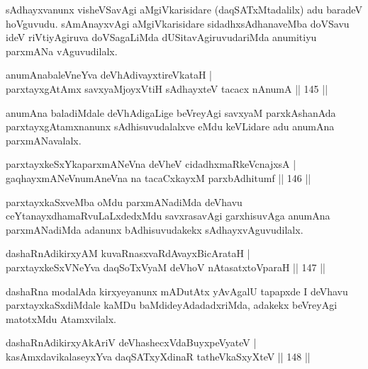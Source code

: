 \begin{artha}
sAdhayxvanunx visheVSavAgi aMgiVkarisidare (daqSATxMtadalilx) adu baradeV hoVguvudu. sAmAnayxvAgi aMgiVkarisidare sidadhxsAdhanaveMba doVSavu ideV riVtiyAgiruva doVSagaLiMda dUSitavAgiruvudariMda anumitiyu parxmANa vAguvudilalx.
\end{artha}

\begin{shl}
anumAnabaleVneYva deVhAdivayxtireVkataH | \\
parxtayxgAtAmx savxyaMjoyxVtiH sAdhayxteV tacacx nAnumA \hfill||  145 ||  
\end{shl}

\begin{artha}
anumAna baladiMdale deVhAdigaLige beVreyAgi savxyaM parxkAshanAda parxtayxgAtamxnanunx sAdhisuvudalalxve eMdu keVLidare adu anumAna parxmANavalalx.
\end{artha}

\begin{shl}
parxtayxkeSxYkaparxmANeVna deVheV cidadhxmaRkeV\s cnajxsA | \\
gaqhayxmANeV\s numAneVna na tacaCxkayxM parxbAdhitumf \hfill||  146 ||  
\end{shl}

\begin{artha}
parxtayxkaSxveMba oMdu parxmANadiMda deVhavu ceYtanayxdhamaRvuLaLxdedxMdu savxrasavAgi garxhisuvAga anumAna parxmANadiMda adanunx bAdhisuvudakekx sAdhayxvAguvudilalx.
\end{artha}

\begin{shl}
dashaRnAdikirxyAM kuvaRnasxvaRdA\s vayxBicArataH | \\
parxtayxkeSxVNeYva daqSoTxV\s yaM deVhoV nAtasatxtoV\s paraH \hfill||  147 ||  
\end{shl}

\begin{artha}
dashaRna modalAda kirxyeyanunx mADutAtx yAvAgalU tapapxde I deVhavu parxtayxkaSxdiMdale kaMDu baMdideyAdadadxriMda, adakekx beVreyAgi matotxMdu Atamxvilalx.
\end{artha}


\begin{shl}
dashaRnAdikirxyAkAriV deVhashecxVdaBuyxpeVyateV | \\
kasAmxdavikalaseyxYva daqSATxyXdinaR tatheVkaSxyXteV \hfill||  148 ||  
\end{shl}

